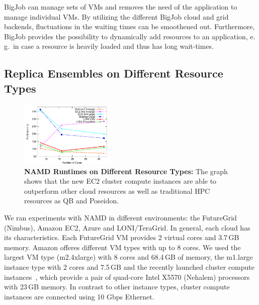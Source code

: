 \documentclass[conference,final]{IEEEtran}
\newcommand{\up}{\vspace*{-1em}}
\begin{document}
BigJob can manage sets of VMs and removes the need of the application
to manage individual VMs. By utilizing the different BigJob cloud and
grid backends, fluctuations in the waiting times can be smoothened
out. Furthermore, BigJob provides the possibility to dynamically add
resources to an application, e.\,g.\ in case a resource is heavily
loaded and thus has long wait-times.



\subsection{Replica Ensembles on Different Resource Types}
\up
\label{sec:performance_namd}

\begin{figure}[t]
    \centering
        \includegraphics[width=0.4\textwidth]{performance/namd_run}
    \caption{\textbf{NAMD Runtimes on Different Resource Types: } The
          graph shows that the new EC2 cluster compute instances are 
          able to outperform other cloud resources as well as traditional
          HPC resources as QB and Poseidon.\up}
    \label{fig:performance_namd_run}
    \up
\end{figure}

We ran experiments with NAMD in different environments: the FutureGrid (Nimbus),
Amazon EC2, Azure and LONI/TeraGrid. 
In general, each cloud has its characteristics. 
Each FutureGrid VM provides 2 virtual cores and 3.7\,GB memory. 
Amazon offeres different VM types with up to 8 cores. We used the largest 
VM type (m2.4xlarge) with 8 cores and 68.4\,GB of memory,
the m1.large instance type with 2 cores and 7.5\,GB  and the recently launched
cluster compute instances~\cite{ec2-cc}, which provide a pair of quad-core Intel 
X5570 (Nehalem) processors with 23\,GB memory. In contrast to other instance types,
cluster compute instances are connected using 10 Gbps Ethernet.
\end{document}
